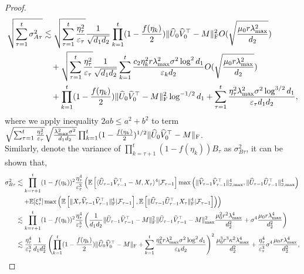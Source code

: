 \documentclass[12pt]{article}
\newcommand\fro[1]{\| #1 \|_{\rm{F}}}
\newcommand{\inp}[2]{\langle #1,#2\rangle}
\def\EE{{\mathbb E}}
\theoremstyle{plain}
\begin{document}
\begin{proof}
\begin{align*}
        \sqrt{\sum_{\tau=1}^t \sigma_{A\tau}^2}&\lesssim \sqrt{\sum_{\tau=1}^t \frac{\eta_{\tau}^2}{\varepsilon_{\tau}}}\frac{1}{\sqrt{d_1d_2}}\prod_{k=1}^{t}(1-\frac{f(\eta_{k})}{2}) \fro{\widehat{U}_{0}\widehat{V}_{0}^{\top} - M}^2O(\sqrt{\frac{\mu_0r\lambda_{\max}^2}{d_2}}) \\ &\quad + \sqrt{\sum_{\tau=1}^t \frac{\eta_{\tau}^2}{\varepsilon_{\tau}}}\frac{1}{\sqrt{d_1d_2}}\sum_{k=1}^{t}\frac{c_2\eta_k^2r\lambda_{\max}^2\sigma^2\log^2d_1}{\varepsilon_kd_2}O(\sqrt{\frac{\mu_0r\lambda_{\max}^2}{d_2}}) \\ &\quad + \prod_{k=1}^{t}(1-\frac{f(\eta_{k})}{2})\fro{\widehat{U}_{0}\widehat{V}_{0}^{\top} - M}^2\log^{-1/2}d_1 + \sum_{\tau=1}^t \frac{\eta_{\tau}^2\lambda_{\max}^2\sigma^2\log^{3/2}d_1}{\varepsilon_{\tau} d_1d_2},
    \end{align*}
    where we apply inequality $2ab\leq a^2+b^2$ to term $\sqrt{\sum_{\tau=1}^t \frac{\eta_{\tau}^2}{\varepsilon_{\tau}}}\sqrt{\frac{\lambda_{\max}^2\sigma^2}{d_1d_2}}\prod_{k=1}^{t}(1-\frac{f(\eta_{k})}{2})^{1/2}\fro{\widehat{U}_{0}\widehat{V}_{0}^{\top} - M}$. \\
    Similarly, denote the variance of $\prod_{k=\tau+1}^{t} (1-f(\eta_k)) B_{\tau}$ as $\sigma_{B\tau}^2$, it can be shown that,
    \begin{align*}
        \sigma_{B\tau}^2&\lesssim \prod_{k=\tau+1}^{t} (1-f(\eta_k))^2 \frac{\eta_{\tau}^4}{\varepsilon_{\tau}^3}\left(\EE\left[\inp{\widehat{U}_{{\tau}-1}\widehat{V}_{{\tau}-1}^{\top}-M}{X_{\tau}}^4|\mathcal{F}_{\tau-1}\right]\max\left(\|\widehat{V}_{\tau-1}\widehat{V}_{\tau-1}^{\top}\|_{2,\max}^4, \|\widehat{U}_{\tau-1}\widehat{U}_{\tau-1}^{\top}\|_{2,\max}^4\right) \right.\\ &\left.\quad + \EE[\xi_{\tau}^4]\max\left(\EE\left[\fro{X_{\tau}\widehat{V}_{\tau-1}\widehat{V}_{\tau-1}^{\top}}^4|\mathcal{F}_{\tau-1}\right], \EE\left[\fro{\widehat{U}_{\tau-1}\widehat{U}_{\tau-1}^{\top}X_{\tau}}^4|\mathcal{F}_{\tau-1}\right]\right)\right) \\ 
        &\lesssim \prod_{k=\tau+1}^{t} (1-f(\eta_k))^2 \frac{\eta_{\tau}^4}{\varepsilon_{\tau}^3}\left(\frac{1}{d_1d_2}\fro{\widehat{U}_{{\tau}-1}\widehat{V}_{{\tau}-1}^{\top}-M}^2\|\widehat{U}_{{\tau}-1}\widehat{V}_{{\tau}-1}^{\top}-M\|_{\max}^2\frac{\mu_0^2r^2\lambda_{\max}^4}{d_2^2}  + \sigma^4\frac{\mu_0r \lambda_{\max}^4}{d_2^2}\right) \\
        &\lesssim \frac{\eta_{\tau}^4}{\varepsilon_{\tau}^3}\frac{1}{d_1d_2^2} \left(\prod_{k=1}^{t} (1-\frac{f(\eta_k)}{2})\fro{\widehat{U}_0\widehat{V}_0^{\top}-M} + \sum_{k=1}^{t}\frac{\eta_k^2r\lambda_{\max}^2\sigma^2\log^2d_1}{\varepsilon_kd_2}\right)^2\frac{\mu_0^3r^3\kappa^2\lambda_{\max}^4}{d_2^2} + \frac{\eta_{\tau}^4}{\varepsilon_{\tau}^3}\sigma^4\frac{\mu_0r\lambda_{\max}^4}{d_2^2},

\end{align*}
\end{proof}
\end{document}
